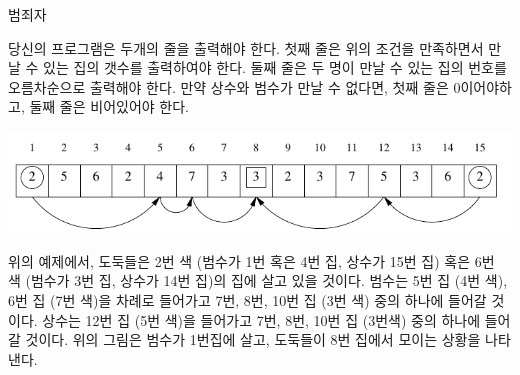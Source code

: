 \begin{problem}{범죄자}
	\OutputFile
	
	당신의 프로그램은 두개의 줄을 출력해야 한다. 첫째 줄은 위의 조건을 만족하면서 만날 수 있는 집의 갯수를 출력하여야 한다. 둘째 줄은 두 명이 만날 수 있는 집의 번호를 오름차순으로 출력해야 한다. 만약 상수와 범수가 만날 수 없다면, 첫째 줄은 0이어야하고, 둘째 줄은 비어있어야 한다.
	
	\Examples
		
	\begin{example}
	\end{example}
	
	\Notes
	
	\begin{center}
		\includegraphics[width=1.0\linewidth]{prz.png}
	\end{center}
	
	위의 예제에서, 도둑들은 2번 색 (범수가 1번 혹은 4번 집, 상수가 15번 집) 혹은 6번 색 (범수가 3번 집, 상수가 14번 집)의 집에 살고 있을 것이다. 범수는 5번 집 (4번 색), 6번 집 (7번 색)을 차례로 들어가고 7번, 8번, 10번 집 (3번 색) 중의 하나에 들어갈 것이다. 상수는 12번 집 (5번 색)을 들어가고 7번, 8번, 10번 집 (3번색) 중의 하나에 들어갈 것이다. 위의 그림은 범수가 1번집에 살고, 도둑들이 8번 집에서 모이는 상황을 나타낸다.
	
\end{problem}

